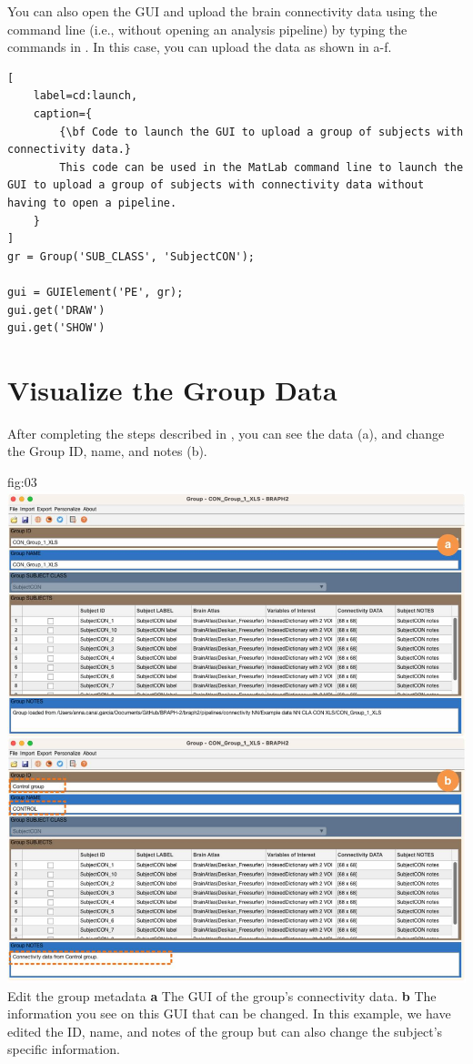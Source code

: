 \documentclass[justified]{tufte-handout}
\begin{document}

\begin{tcolorbox}[
	title=GUI launch from command line
]
You can also open the GUI and upload the brain connectivity data using the command line (i.e., without opening an analysis pipeline) by typing the commands in . In this case, you can upload the data as shown in a-f.

\begin{lstlisting}[
	label=cd:launch,
	caption={
		{\bf Code to launch the GUI to upload a group of subjects with connectivity data.}
		This code can be used in the MatLab command line to launch the GUI to upload a group of subjects with connectivity data without having to open a pipeline.
	}
]
gr = Group('SUB_CLASS', 'SubjectCON');

gui = GUIElement('PE', gr);
gui.get('DRAW')
gui.get('SHOW')
\end{lstlisting}
\end{tcolorbox}

\section{Visualize the Group Data}

After completing the steps described in , you can see the data (a), and change the Group ID, name, and notes (b). 

	{fig:03}
	{
	\includegraphics{fig03.jpg}
	}
	{Edit the group metadata}
	{ 
	{\bf a} The GUI of the group's connectivity data. 
	{\bf b} The information you see on this GUI that can be changed. In this example, we have edited the ID, name, and notes of the group but can also change the subject's specific information.
	}
\end{document}
